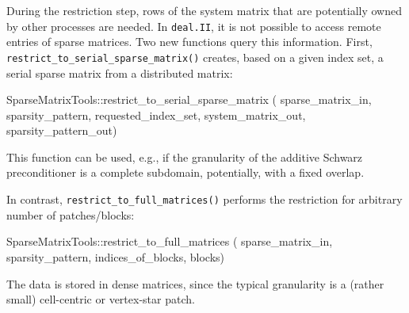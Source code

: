 \documentclass{ansarticle-preprint}
\newcommand{\specialword}[1]{\texttt{#1}}
\newcommand{\dealii}{{\specialword{deal.II}}\xspace}
\begin{document}
\begin{itemize}
  During the restriction step,
  rows of the system matrix that are potentially owned by other
  processes are needed.  In \dealii, it is not possible to access remote entries
  of sparse matrices. Two new functions query this information. First,
  \texttt{restrict\_to\_serial\_sparse\_matrix()} creates, based
  on a given index set, a serial
  sparse matrix from a distributed matrix:
\begin{c++}
SparseMatrixTools::restrict_to_serial_sparse_matrix (
  sparse_matrix_in, sparsity_pattern, requested_index_set, 
  system_matrix_out, sparsity_pattern_out)
\end{c++}
This function can be used, e.g., if the granularity of the additive Schwarz preconditioner
is a complete subdomain, potentially, with a fixed overlap.

In contrast, \texttt{restrict\_to\_full\_matrices()} performs the restriction
for arbitrary number of patches/blocks:

\begin{c++}
SparseMatrixTools::restrict_to_full_matrices (
  sparse_matrix_in, sparsity_pattern, indices_of_blocks, blocks)
\end{c++}

The data is stored in dense matrices, since the typical granularity is a (rather small) cell-centric or
vertex-star patch.
  

\end{itemize}
\end{document}
